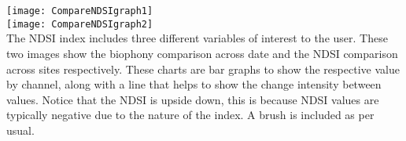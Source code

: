 \texttt{[image: CompareNDSIgraph1]}\\
\texttt{[image: CompareNDSIgraph2]}\\
The NDSI index includes three different variables of interest to the user. These two images show the biophony comparison across date and the NDSI comparison across sites respectively. These charts are bar graphs to show the respective value by channel, along with a line that helps to show the change intensity between values. Notice that the NDSI is upside down, this is because NDSI values are typically negative due to the nature of the index. A brush is included as per usual.\\
